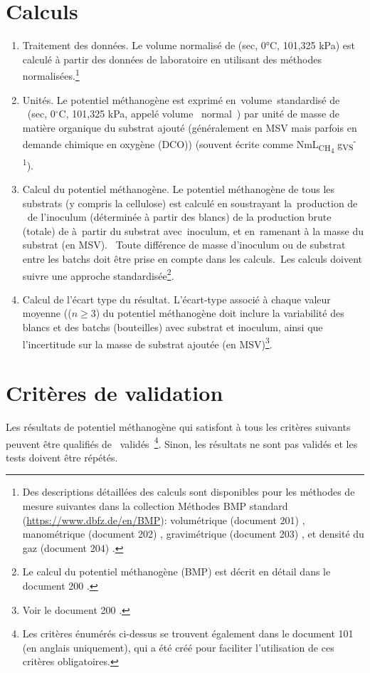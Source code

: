 \documentclass[]{article}
\begin{document}
\section{Calculs}
\label{sec:calculations}
\begin{enumerate}
  \item Traitement des données. 
    Le volume normalisé de  (sec, 0°C, 101,325 kPa) est calculé à partir des données de laboratoire en utilisant des méthodes normalisées.\footnote{
    Des descriptions détaillées des calculs sont disponibles pour les méthodes de mesure suivantes dans la collection Méthodes BMP standard (\url{https://www.dbfz.de/en/BMP}): volumétrique (document 201) \citep{BMPdoc201vol}, manométrique (document 202) \citep{BMPdoc202man}, gravimétrique (document 203) \citep{BMPdoc203grav}, et densité du gaz (document 204) \citep{BMPdoc204gasdens}.
    }
  \item Unités. 
    Le potentiel méthanogène est exprimé en volume standardisé de  (sec, 0$^\circ$C, 101,325 kPa, appelé volume \guillemotleft~normal~\guillemotright) par unité de masse de matière organique du substrat ajouté (généralement en MSV mais parfois en demande chimique en oxygène (DCO)) (souvent écrite comme NmL\textsubscript{CH\textsubscript{4}} g\textsubscript{VS}\textsuperscript{-1}). 
  \item Calcul du potentiel méthanogène.
    Le potentiel méthanogène de tous les substrats (y compris la cellulose) est calculé en soustrayant la production de  de l’inoculum (déterminée à partir des blancs) de la production brute (totale) de  à partir du substrat avec inoculum, et en ramenant à la masse du substrat (en MSV). 
    Toute différence de masse d'inoculum ou de substrat entre les batchs doit être prise en compte dans les calculs. Les calculs doivent suivre une approche standardisée\footnote{
    Le calcul du potentiel méthanogène (BMP) est décrit en détail dans le document 200 \citep{BMPdoc200BMP}.
    }.
  \item Calcul de l’écart type du résultat. 
    L'écart-type associé à chaque valeur moyenne (($n \ge 3$) du potentiel méthanogène doit inclure la variabilité des blancs et des batchs (bouteilles) avec substrat et inoculum, ainsi que l'incertitude sur la masse de substrat ajoutée (en MSV)\footnote{
      Voir le document 200 \citep{BMPdoc200BMP}.
    }.
\end{enumerate}

\section{Critères de validation}
\label{sec:crit}
Les résultats de potentiel méthanogène qui satisfont à tous les critères suivants peuvent être qualifiés de \guillemotleft~validés~\guillemotright \footnote{
Les critères énumérés ci-dessus se trouvent également dans le document 101 \citep{BMPdoc101val} (en anglais uniquement), qui a été créé pour faciliter l’utilisation de  ces critères obligatoires.
}.
Sinon, les résultats ne sont pas validés et les tests doivent être répétés.
\end{document}
